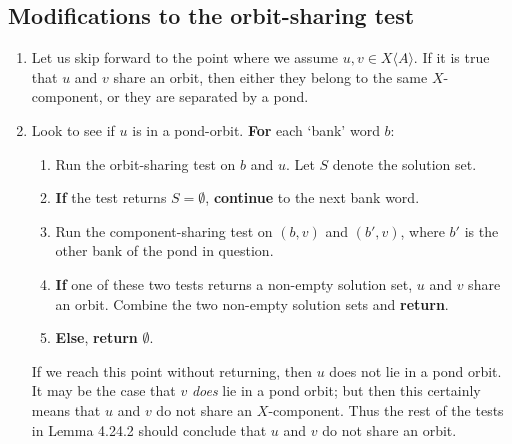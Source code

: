\documentclass[12pt]{article}
\def\ofA{\langle A \rangle}
\newcommand\alert\textbf
\begin{document}
\subsection{Modifications to the orbit-sharing test}
\begin{enumerate}
	\item Let us skip forward to the point where we assume $u, v \in X\ofA$. If it is true that $u$ and $v$ share an orbit, then either they belong to the same $X$-component, or they are separated by a pond.
	
	\item Look to see if $u$ is in a pond-orbit. \alert{For} each `bank' word $b$:
	\begin{enumerate}
		\item Run the orbit-sharing test on $b$ and $u$. Let $S$ denote the solution set.
		\item \alert{If} the test returns $S=\emptyset$, \alert{continue} to the next bank word.
		\item Run the component-sharing test on $(b, v)$ and $(b', v)$, where $b'$ is the other bank of the pond in question.
		\item \alert{If} one of these two tests returns a non-empty solution set, $u$ and $v$ share an orbit. Combine the two non-empty solution sets and \alert{return}.
		\item \alert{Else}, \alert{return} $\emptyset$.
	\end{enumerate}
	If we reach this point without returning, then $u$ does not lie in a pond orbit. It may be the case that $v$ \emph{does} lie in a pond orbit; but then this certainly means that $u$ and $v$ do not share an $X$-component. Thus the rest of the tests in Lemma 4.24.2 should conclude that $u$ and $v$ do not share an orbit.
\end{enumerate}
\end{document}
